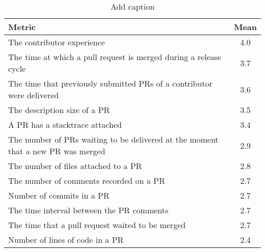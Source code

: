 \begin{table}[htbp]
  \centering
  \caption{Add caption}
    \begin{tabular}{lc}
    \toprule
    \textbf{Metric} & \textbf{Mean} \\
    \midrule
    The contributor experience & 4.0 \\
    The time at which a pull request is merged during a release cycle & 3.7 \\
    The time that previously submitted PRs of a contributor were delivered & 3.6 \\
    The description size of a PR & 3.5 \\
    A PR has a stacktrace attached & 3.4 \\
    The number of PRs waiting to be delivered at the moment that a new PR was merged & 2.9 \\
    The number of files attached to a PR & 2.8 \\
    The number of comments recorded on a PR & 2.7 \\
    Number of commits in a PR & 2.7 \\
    The time interval between the PR comments & 2.7 \\
    The time that a pull request waited to be merged & 2.7 \\
    Number of lines of code in a PR & 2.4 \\
    \bottomrule
    \end{tabular}%
  \label{tab:addlabel}%
\end{table}%

